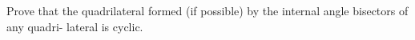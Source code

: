 Prove that the quadrilateral formed (if possible)
by the internal angle bisectors of any quadri-
lateral is cyclic.
